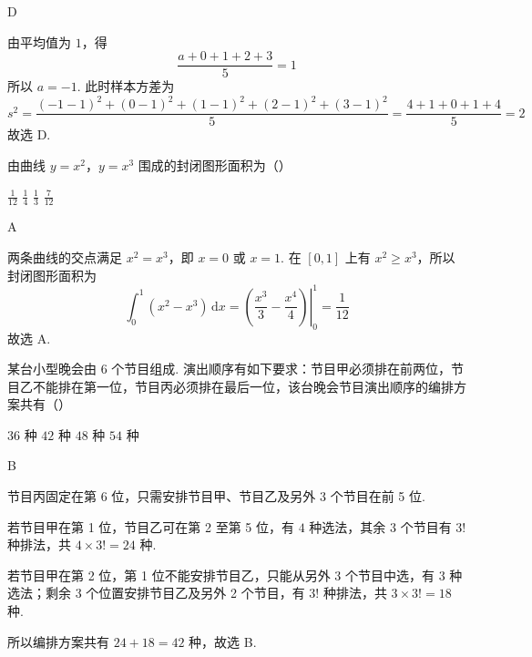 \begin{answer}
D
\end{answer}

\begin{solution}
由平均值为 \(1\)，得
\[
\frac{a+0+1+2+3}{5}=1
\]
所以 \(a=-1\). 此时样本方差为
\[
s^2=\frac{(-1-1)^2+(0-1)^2+(1-1)^2+(2-1)^2+(3-1)^2}{5}=\frac{4+1+0+1+4}{5}=2
\]
故选 D.
\end{solution}

\begin{problem}
由曲线 \( y = x^2 \)，\( y = x^3 \) 围成的封闭图形面积为（\quad）

\choices
    {\(\frac{1}{12}\)}
    {\(\frac{1}{4}\)}
    {\(\frac{1}{3}\)}
    {\(\frac{7}{12}\)}
\end{problem}

\begin{answer}
A
\end{answer}

\begin{solution}
两条曲线的交点满足 \(x^2=x^3\)，即 \(x=0\) 或 \(x=1\). 在 \([0,1]\) 上有 \(x^2\geqslant x^3\)，所以封闭图形面积为
\[
\int_0^1(x^2-x^3)\,\mathrm{d}x=\left.\left(\frac{x^3}{3}-\frac{x^4}{4}\right)\right|_0^1=\frac{1}{12}
\]
故选 A.
\end{solution}

\begin{problem}
某台小型晚会由 6 个节目组成. 演出顺序有如下要求：节目甲必须排在前两位，节目乙不能排在第一位，节目丙必须排在最后一位，该台晚会节目演出顺序的编排方案共有（\quad）

\choices
    {\(36\text{ 种}\)}
    {\(42\text{ 种}\)}
    {\(48\text{ 种}\)}
    {\(54\text{ 种}\)}
\end{problem}

\begin{answer}
B
\end{answer}

\begin{solution}
节目丙固定在第 6 位，只需安排节目甲、节目乙及另外 3 个节目在前 5 位.

若节目甲在第 1 位，节目乙可在第 2 至第 5 位，有 \(4\) 种选法，其余 3 个节目有 \(3!\) 种排法，共 \(4\times3!=24\) 种.

若节目甲在第 2 位，第 1 位不能安排节目乙，只能从另外 3 个节目中选，有 \(3\) 种选法；剩余 3 个位置安排节目乙及另外 2 个节目，有 \(3!\) 种排法，共 \(3\times3!=18\) 种.

所以编排方案共有 \(24+18=42\) 种，故选 B.
\end{solution}

